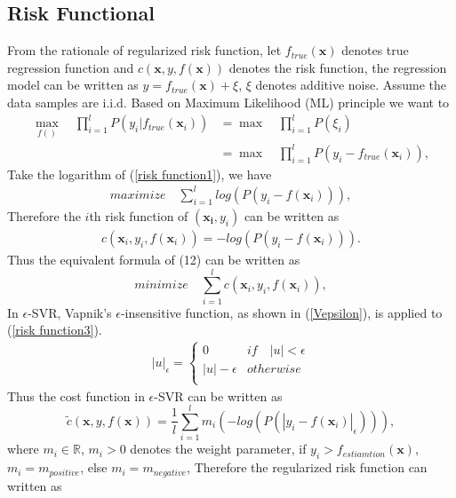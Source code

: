 \documentclass[12pt, draftclsnofoot, onecolumn]{IEEEtran}
\begin{document}
\begin{spacing}{2}
\subsection{Risk Functional}\label{risk functional}
From the rationale of regularized risk function, let $f_{true}(\mathbf{x})$ denotes true regression function and $c(\mathbf{x},y,f(\mathbf{x}))$ denotes the risk function, the regression model can be written as $y=f_{true}(\mathbf{x})+\xi$, $\xi$ denotes additive noise. Assume the data samples are i.i.d. Based on Maximum Likelihood (ML) principle we want to  
\begin{eqnarray}
\nonumber
\max_{f()}\quad \prod_{i=1}^{l}P(y_{i}|f_{true}(\mathbf{x}_{i}))&=\max\quad \prod_{i=1}^{l}P(\xi_{i})\\
&=\max\quad \prod_{i=1}^{l}P(y_{i}-f_{true}(\mathbf{x}_{i})),
\label{risk function1}
\end{eqnarray}
Take the logarithm of (\ref{risk function1}), we have
\begin{eqnarray}
maximize\quad \sum_{i=1}^{l}log(P(y_{i}-f(\mathbf{x}_{i}))),
\label{risk function2}
\end{eqnarray}
Therefore the $i$th risk function of $(\mathbf{x_{i}}, y_{i})$ can be written as 
\begin{eqnarray}
c(\mathbf{x}_{i}, y_{i}, f(\mathbf{x}_{i}))=-log(P(y_{i}-f(\mathbf{x}_{i}))).
\label{risk function3}
\end{eqnarray}
Thus the equivalent formula of (12) can be written as 
\begin{equation}
minimize\quad  \sum_{i=1}^{l}c(\mathbf{x}_{i}, y_{i}, f(\mathbf{x}_{i})),
\label{Total risk function}
\end{equation} 
In $\epsilon$-SVR, Vapnik's $\epsilon$-insensitive function, as shown in (\ref{Vepsilon}), is applied to (\ref{risk function3}).
\begin{eqnarray}
|u|_{\epsilon}=\left\{\begin{array}{ll}
0   &if\quad |u|<\epsilon\\
|u|-\epsilon  &otherwise\\
\end{array}\right.
\label{Vepsilon}
\end{eqnarray}
Thus the cost function in $\epsilon$-SVR can be written as 
\begin{equation}
\tilde{c}(\mathbf{x}, y, f(\mathbf{x}))=\frac{1}{l}\sum_{i=1}^{l}m_{i}(-log(P(|y_{i}-f(\mathbf{x}_{i})|_{\epsilon}))),
\label{cost function}
\end{equation}
where $m_{i}\in \mathbb{R}$, $m_{i}>0$ denotes the weight parameter, if $y_{i}>f_{estiamtion}(\mathbf{x})$, $m_{i}=m_{positive}$, else $m_{i}=m_{negative}$, Therefore the regularized risk function can written as 

\end{spacing}
\end{document}
